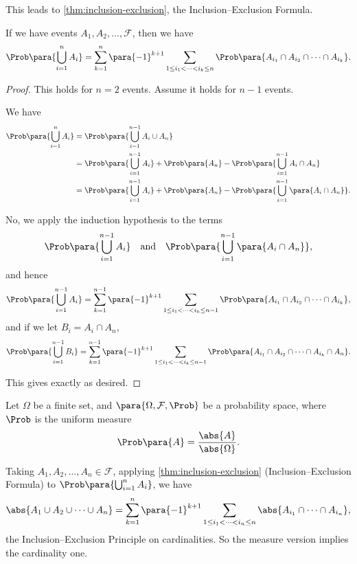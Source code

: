 This leads to \autoref{thm:inclusion-exclusion}, the Inclusion--Exclusion Formula.

\begin{theorem}
    \label{thm:inclusion-exclusion}%
    If we have events \(A_1, A_2, \ldots, \mathcal{F}\), then we have
    \[
        \Prob\para{\bigcup_{i = 1}^{n} A_i} = \sum_{k = 1}^{n} \para{-1}^{k + 1} \sum_{1 \leq i_1 < \cdots < i_k \leq n} \Prob\para{A_{i_1} \cap A_{i_2} \cap \cdots \cap A_{i_k}}.
    \]
\end{theorem}

\begin{proof}
    This holds for \(n = 2\) events. Assume it holds for \(n - 1\) events.

    We have
    \begin{align*}
        \Prob\para{\bigcup_{i = 1}^{n} A_i} &= \Prob\para{\bigcup_{i = 1}^{n - 1} A_i \cup A_n} \\
        &= \Prob\para{\bigcup_{i = 1}^{n - 1} A_i} + \Prob\para{A_n} - \Prob\para{\bigcup_{i = 1}^{n - 1} A_i \cap A_n} \\
        &= \Prob\para{\bigcup_{i = 1}^{n - 1} A_i} + \Prob\para{A_n} - \Prob\para{\bigcup_{i = 1}^{n - 1} \para{A_i \cap A_n}}.
    \end{align*}

    No, we apply the induction hypothesis to the terms
    \[
        \Prob\para{\bigcup_{i = 1}^{n - 1} A_i} \quad \text{and} \quad \Prob\para{\bigcup_{i = 1}^{n - 1} \para{A_i \cap A_n}},
    \]
    and hence
    \[
        \Prob\para{\bigcup_{i = 1}^{n - 1} A_i} = \sum_{k = 1}^{n - 1} \para{-1}^{k + 1} \sum_{1 \leq i_1 < \cdots < i_k \leq n - 1} \Prob\para{A_{i_1} \cap A_{i_2} \cap \cdots \cap A_{i_k}},
    \]
    and if we let \(B_i = A_i \cap A_n\),
    \[
        \Prob\para{\bigcup_{i = 1}^{n - 1} B_i} = \sum_{k = 1}^{n - 1} \para{-1}^{k + 1} \sum_{1 \leq i_1 < \cdots < i_k \leq n - 1} \Prob\para{A_{i_1} \cap A_{i_2} \cap \cdots \cap A_{i_k} \cap A_n}.
    \]

    This gives exactly as desired.
\end{proof}

\begin{remark}
    Let \(\Omega\) be a finite set, and \(\para{\Omega, \mathcal{F}, \Prob}\) be a probability space, where \(\Prob\) is the uniform measure
    \[
        \Prob\para{A} = \frac{\abs{A}}{\abs{\Omega}}.
    \]

    Taking \(A_1, A_2, \ldots, A_n \in \mathcal{F}\), applying \autoref{thm:inclusion-exclusion} (Inclusion--Exclusion Formula) to \(\Prob\para{\bigcup_{i = 1}^{n} A_i}\), we have
    \[
        \abs{A_1 \cup A_2 \cup \cdots \cup A_n} = \sum_{k = 1}^{n} \para{-1}^{k + 1} \sum_{1 \leq i_1 < \cdots < i_n \leq n} \abs{A_{i_1} \cap \cdots \cap A_{i_n}},
    \]
    the Inclusion--Exclusion Principle on cardinalities. So the measure version implies the cardinality one.
\end{remark}

